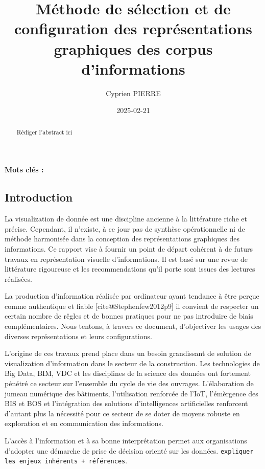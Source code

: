 \documentclass[a4paper,12pt]{article}
\author{Cyprien PIERRE \orcidlink{0009-0009-9040-6795}}
\date{2025-02-21}
\title{Méthode de sélection et de configuration des représentations graphiques des corpus d'informations}
\begin{document}
\maketitle
\begin{abstract}
Rédiger l'abstract ici
\end{abstract}

\renewcommand\{\keywordsname\{\textbf{Mots clés : }

\begin{multicols}{2}
\section*{Introduction}
\label{sec:org0384272}
La visualization de donnée est une discipline ancienne à la littérature riche et précise. Cependant, il n'existe, à ce jour pas de synthèse opérationnelle ni de méthode harmonisée dans la conception des représentations graphiques des informations. Ce rapport vise à fournir un point de départ cohérent à de futurs travaux en représentation visuelle d'informations. Il est basé sur une revue de littérature rigoureuse et les recommendations qu'il porte sont issues des lectures réalisées.

La production d'information réalisée par ordinateur ayant tendance à être perçue comme authentique et fiable [cite@Stephenfew2012p9] il convient de respecter un certain nombre de rêgles et de bonnes pratiques pour ne pas introduire de biais complémentaires. Nous tentons, à travers ce document, d'objectiver les usages des diverses représentations et leurs configurations.

L'origine de ces travaux prend place dans un besoin grandissant de solution de visualization d'information dans le secteur de la construction. Les technologies de Big Data, BIM, VDC et les disciplines de la science des données ont fortement pénétré ce secteur sur l'ensemble du cycle de vie des ouvrages. \autocite{asiauniversitytaichungtaiwanResearchApplicationFunctiontechnologyaesthetics2020} L'élaboration de jumeau numérique des bâtiments, l'utilisation renforcée de l'IoT, l'émèrgence des BIS et BOS et l'intégration des solutions d'intelligences artificielles renforcent d'autant plus la nécessité pour ce secteur de se doter de moyens robuste en exploration et en communication des informations.

L'accès à l'information et à sa bonne interprétation permet aux organisations d'adopter une démarche de prise de décision orienté sur les données. \autocite{sosulskiDataVisualizationMade2019}  \texttt{expliquer les enjeux inhérents + références}.


\end{multicols}
\end{document}
